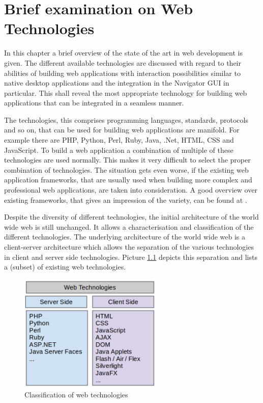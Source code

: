 \chapter{Brief examination on Web Technologies}\label{chap:web_dev}

In this chapter a brief overview of the state of the art in web development is given.
The different available technologies are discussed with regard to their abilities of building web applications with interaction possibilities similar to native desktop applications and the integration in the Navigator GUI in particular.
This shall reveal the most appropriate technology for building web applications that can be integrated in a seamless manner.

The technologies, this comprises programming languages, standards, protocols and so on, that can be used for building web applications are manifold.
For example there are PHP, Python, Perl, Ruby, Java, .Net, HTML, CSS and JavaScript.
To build a web application a combination of multiple of these technologies are used normally.
This makes it very difficult to select the proper combination of technologies.
The situation gets even worse, if the existing web application frameworks, that are usually used when building more complex and professional web applications, are taken into consideration.
A good overview over existing frameworks, that gives an impression of the variety, can be found at \autocite{web-dev:list-frameworks}.

Despite the diversity of different technologies, the initial architecture of the world wide web is still unchanged.
It allows a characterisation and classification of the different technologies.
The underlying architecture of the world wide web is a client-server architecture which allows the separation of the various technologies in client and server side technologies.
Picture \ref{fig:web-technologies} depicts this separation and lists a (subset) of existing web technologies.

\begin{figure}
	\centering \includegraphics[width=0.61\textwidth]{./img/web-dev/web_technologies.png}
	\caption{Classification of web technologies}
	\label{fig:web-technologies}
\end{figure}


